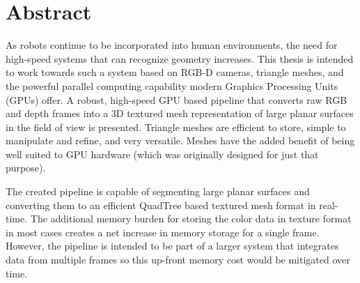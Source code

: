 \chapter*{Abstract}
%
As robots continue to be incorporated into human environments, the need for high-speed systems that can recognize geometry increases. This thesis is intended to work towards such a system based on RGB-D cameras, triangle meshes, and the powerful parallel computing capability modern Graphics Processing Units (GPUs) offer.  A robust, high-speed GPU based pipeline that converts raw RGB and depth frames into a 3D textured mesh representation of large planar surfaces in the field of view is presented. Triangle meshes are efficient to store, simple to manipulate and refine, and very versatile. Meshes have the added benefit of being well suited to GPU hardware (which was originally designed for just that purpose).\par
The created pipeline is capable of segmenting large planar surfaces and converting them to an efficient QuadTree based textured mesh format in real-time. The additional memory burden for storing the color data in texture format in most cases creates a net increase in memory storage for a single frame. However, the pipeline is intended to be part of a larger system that integrates data from multiple frames so this up-front memory cost would be mitigated over time.